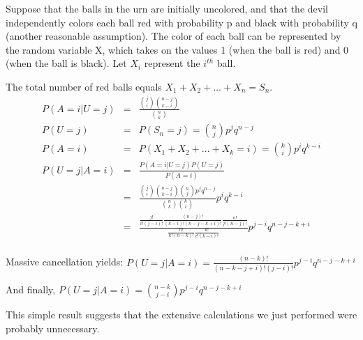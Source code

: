 Suppose that the balls in the urn are initially uncolored, and that the
devil independently colors each ball red with probability p and black with
probability q (another reasonable assumption). The color of each ball can be
represented by the random variable X, which takes on the values 1 (when the
ball is red) and 0 (when the ball is black). Let $X_i$ represent the $i^{th}$ ball.

The total number of red balls equals $X_1 + X_2 + \ldots + X_n = S_n$.
\begin{eqnarray*}
P(A=i|U=j) &=& \frac{{{j}\choose{i}}{{n-j}\choose{k-i}}}{{{n}\choose{k}}}\\
P(U=j) &=& P(S_n=j) = {{n}\choose{j}}p^{j}q^{n-j}\\
P(A=i) &=& P(X_1+X_2+\ldots+X_k=i) = {{k}\choose{i}}p^{i}q^{k-i}\\
P(U=j|A=i) &=& \frac{P(A=i|U=j)P(U=j)}{P(A=i)}\\
&=& \frac{{{j}\choose{i}}{{n-j}\choose{k-i}}{{n}\choose{j}}p^{j}q^{n-j}}{{{n}\choose{k}}{{k}\choose{i}}}p^{i}q^{k-i}\\
&=& \frac{\frac{j!}{i!(j-i)!}\frac{(n-j)!}{(k-i)!(n-j-k+i)!}\frac{n!}{j!(n-j)!}} {\frac{n!}{k!(n-k)!} \frac{k!}{i!(k-i)!}} p^{j-i}q^{n-j-k+i}\\
\end{eqnarray*}

Massive cancellation yields:
$P(U=j|A=i) = \frac{(n-k)!}{(n-k-j+i)!(j-i)!}p^{j-i}q^{n-j-k+i}$

And finally,
$P(U=j|A=i) = {{n-k}\choose{j-i}}p^{j-i}q^{n-j-k+i}$

This simple result suggests that the extensive calculations we just performed were probably unnecessary.


